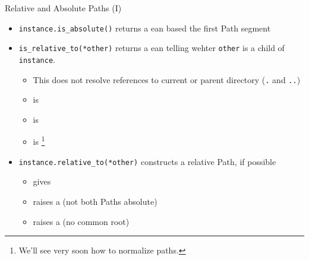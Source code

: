 \begin{frame}[fragile]{Relative and Absolute Paths (I)}
%
\begin{itemize}
\item \texttt{instance.is\_absolute()} returns a ean based the first Path segment
\item \texttt{is\_relative\_to(*other)} returns a ean telling wehter \texttt{other} is a child of \texttt{instance}.
	\begin{itemize}
	\item This does not resolve references to current or parent directory (\texttt{.} and \texttt{..})
	\item {} is 
	\item {} is 
	\item {} is \footnote{%
		We'll see very soon how to normalize paths.	
	}
	\end{itemize}
\item \texttt{instance.relative\_to(*other)} constructs a relative Path, if possible
	\begin{itemize}
	\item {} gives 
	\item {} raises a  (not both Paths absolute)
	\item {} raises a  (no common root)
	\end{itemize}
\end{itemize}
%
\end{frame}



